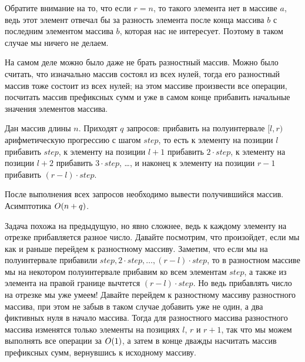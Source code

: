 
\begin{observation}
    Обратите внимание на то, что если $r = n$, то такого элемента нет в массиве $a$, ведь этот элемент отвечал бы за разность элемента после конца массива $b$ с последним элементом массива $b$, которая нас не интересует. Поэтому в таком случае мы ничего не делаем.
\end{observation}

\begin{observation}
    На самом деле можно было даже не брать разностный массив. Можно было считать, что изначально массив состоял из всех нулей, тогда его разностный массив тоже состоит из всех нулей; на этом массиве произвести все операции, посчитать массив префиксных сумм и уже в самом конце прибавить начальные значения элементов массива.
\end{observation}

\begin{problem}
    Дан массив длины $n$. Приходят $q$ запросов: прибавить на полуинтервале $[l, r)$ арифметическую прогрессию с шагом $step$, то есть к элементу на позиции $l$ прибавить $step$, к элементу на позиции $l + 1$ прибавить $2 \cdot step$, к элементу на позиции $l + 2$ прибавить $3 \cdot step$, \ldots, и наконец к элементу на позиции $r - 1$ прибавить $\left(r - l\right) \cdot step$.

    После выполнения всех запросов необходимо вывести получившийся массив. Асимптотика $O(n + q)$.
\end{problem}

\begin{solution}
    Задача похожа на предыдущую, но явно сложнее, ведь к каждому элементу на отрезке прибавляется разное число.
    Давайте посмотрим, что произойдет, если мы как и раньше перейдем к разностному массиву.
    Заметим, что если мы на полуинтервале прибавили $step, 2 \cdot step, \ldots, (r - l) \cdot step$, то в разностном массиве мы на некотором полуинтервале прибавим ко всем элементам $step$, а также из элемента на правой границе вычтется $(r - l) \cdot step$. Но ведь прибавлять число на отрезке мы уже умеем! Давайте перейдем к разностному массиву разностного массива, при этом не забыв в таком случае добавить уже не один, а два фиктивных нуля в начало массива. Тогда для разностного массива разностного массива изменятся только элементы на позициях $l$, $r$ и $r + 1$, так что мы можем выполнять все операции за $O(1)$, а затем в конце дважды насчитать массив префиксных сумм, вернувшись к исходному массиву.
\end{solution}

